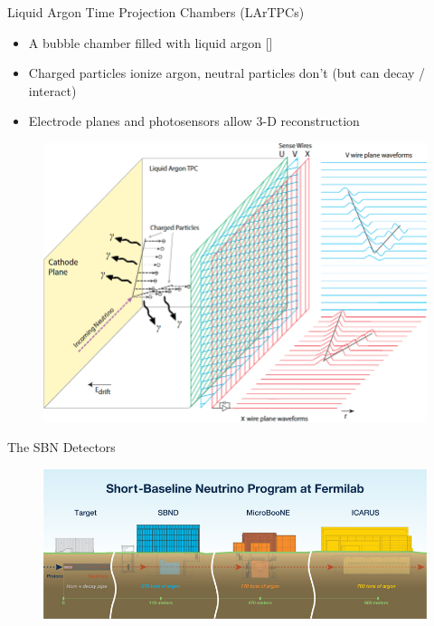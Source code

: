 \documentclass{beamer}
\begin{document}
\begin{frame}{Liquid Argon Time Projection Chambers (LArTPCs)}
    \begin{itemize}
        \item A bubble chamber filled with liquid argon \footnotesize[\cite{ichep2018}]\normalsize
        \vspace{0.5 cm}
        \item Charged particles ionize argon, neutral particles don't (but can decay / interact)
        \vspace{0.5 cm}
        \item Electrode planes and photosensors allow 3-D reconstruction 
    \end{itemize}
    
    \vspace{-3cm}
    \begin{figure}
        \centering
        \includegraphics[width = 0.8\linewidth]{umn/lartpc.png}
        \label{fig:lartpc}
    \end{figure}
    \centering
    \tiny
    \cite{LArTPC}
\end{frame}

\begin{frame}{The SBN Detectors}
    \begin{figure}
        \centering
        \includegraphics[width = \linewidth]{umn/sbn-detectors.png}
        \label{fig:sbn-detectors}
    \end{figure}
    \vspace{-1 cm}
    \centering
    \tiny
    \cite{sbn-diagram}
    \normalsize
\end{frame}
\end{document}
